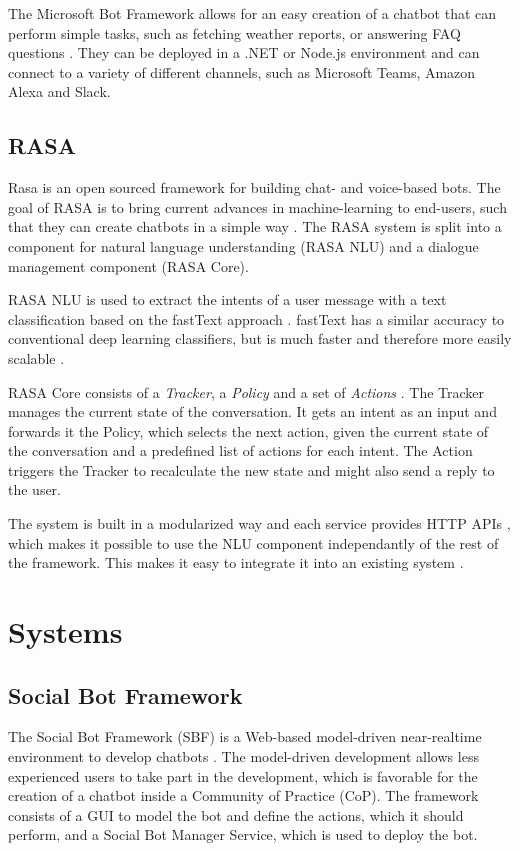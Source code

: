 The Microsoft Bot Framework allows for an easy creation of a chatbot that can perform simple tasks, such as fetching weather reports, or answering FAQ questions \cite{CaWh14}. They can be deployed in a .NET or Node.js environment and can connect to a variety of different channels, such as Microsoft Teams, Amazon Alexa and Slack.

\subsection{RASA}
Rasa is an open sourced framework for building chat- and voice-based bots. The goal of RASA is to bring current advances in machine-learning to end-users, such that they can create chatbots in a simple way \cite{BFPN17}. The RASA system is split into a component for natural language understanding (RASA NLU) and a dialogue management component (RASA Core).

RASA NLU is used to extract the intents of a user message with a text classification based on the fastText approach \cite{BFPN17}. fastText has a similar accuracy to conventional deep learning classifiers, but is much faster and therefore more easily scalable \cite{JGBM16}.

RASA Core consists of a \emph{Tracker}, a \emph{Policy} and a set of \emph{Actions} \cite{BFPN17}. The Tracker manages the current state of the conversation. It gets an intent as an input and forwards it the Policy, which selects the next action, given the current state of the conversation and a predefined list of actions for each intent. The Action triggers the Tracker to recalculate the new state and might also send a reply to the user.

The system is built in a modularized way and each service provides HTTP APIs \cite{BFPN17}, which makes it possible to use the NLU component independantly of the rest of the framework. This makes it easy to integrate it into an existing system \cite{RaKe19}.

\section{Systems} \label{lab:systems}

\subsection{Social Bot Framework}

The Social Bot Framework (SBF) is a Web-based model-driven near-realtime environment to develop chatbots \cite{NLKl19}. The model-driven development allows less experienced users to take part in the development, which is favorable for the creation of a chatbot inside a Community of Practice (CoP). The framework consists of a GUI to model the bot and define the actions, which it should perform, and a Social Bot Manager Service, which is used to deploy the bot.


